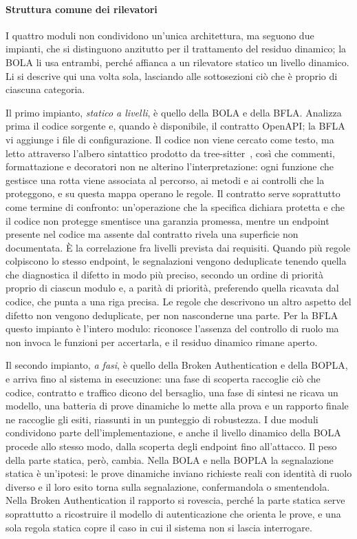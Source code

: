 \paragraph{Struttura comune dei rilevatori}
I quattro moduli non condividono un'unica architettura, ma seguono due
impianti, che si distinguono anzitutto per il trattamento del residuo
dinamico; la BOLA li usa entrambi, perché affianca a un rilevatore statico un
livello dinamico. Li si descrive qui una volta sola, lasciando alle
sottosezioni ciò che è proprio di ciascuna categoria.

Il primo impianto, \emph{statico a livelli}, è quello della BOLA e della BFLA.
Analizza prima il codice sorgente e, quando è disponibile, il contratto
OpenAPI; la BFLA vi aggiunge i file di configurazione. Il codice non viene
cercato come testo, ma letto attraverso l'albero sintattico prodotto da
tree-sitter~\cite{treesitter2026docs}, così che commenti, formattazione e
decoratori non ne alterino l'interpretazione: ogni funzione che gestisce una
rotta viene associata al percorso, ai metodi e ai controlli che la proteggono,
e su questa mappa operano le regole. Il contratto serve soprattutto come
termine di confronto: un'operazione che la specifica dichiara protetta e che il
codice non protegge smentisce una garanzia promessa, mentre un endpoint
presente nel codice ma assente dal contratto rivela una superficie non
documentata. È la correlazione fra livelli prevista dai requisiti. Quando più
regole colpiscono lo stesso endpoint, le segnalazioni vengono deduplicate
tenendo quella che diagnostica il difetto in modo più preciso, secondo un
ordine di priorità proprio di ciascun modulo e, a parità di priorità,
preferendo quella ricavata dal codice, che punta a una riga precisa. Le regole
che descrivono un altro aspetto del difetto non vengono deduplicate, per non
nasconderne una parte. Per la BFLA questo impianto è l'intero modulo: riconosce
l'assenza del controllo di ruolo ma non invoca le funzioni per accertarla, e il
residuo dinamico rimane aperto.

Il secondo impianto, \emph{a fasi}, è quello della Broken Authentication e
della BOPLA, e arriva fino al sistema in esecuzione: una fase di scoperta
raccoglie ciò che codice, contratto e traffico dicono del bersaglio, una fase di
sintesi ne ricava un modello, una batteria di prove dinamiche lo mette alla
prova e un rapporto finale ne raccoglie gli esiti, riassunti in un punteggio di
robustezza. I due moduli condividono parte dell'implementazione, e anche il
livello dinamico della BOLA procede allo stesso modo, dalla scoperta degli
endpoint fino all'attacco. Il peso della parte statica, però, cambia. Nella
BOLA e nella BOPLA la segnalazione statica è un'ipotesi: le prove dinamiche
inviano richieste reali con identità di ruolo diverso e il loro esito torna
sulla segnalazione, confermandola o smentendola. Nella Broken Authentication
il rapporto si rovescia, perché la parte statica serve soprattutto a
ricostruire il modello di autenticazione che orienta le prove, e una sola
regola statica copre il caso in cui il sistema non si lascia interrogare.

